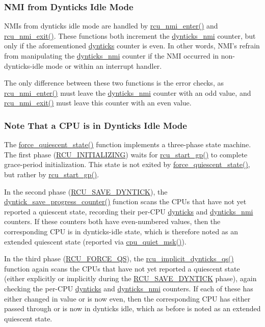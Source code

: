 \subsubsection{NMI from Dynticks Idle Mode}
\label{app:rcuimpl:rcutree:NMI from Dynticks Idle Mode}

NMIs from dynticks idle mode are handled by \url{rcu_nmi_enter()}
and \url{rcu_nmi_exit()}.
These functions both increment the \url{dynticks_nmi} counter,
but only if the aforementioned \url{dynticks} counter is even.
In other words, NMI's refrain from manipulating the
\url{dynticks_nmi} counter if the NMI occurred in non-dynticks-idle
mode or within an interrupt handler.

The only difference between these two functions is the error checks,
as \url{rcu_nmi_enter()} must leave the \url{dynticks_nmi}
counter with an odd value, and \url{rcu_nmi_exit()} must leave
this counter with an even value.

\subsubsection{Note That a CPU is in Dynticks Idle Mode}
\label{app:rcuimpl:rcutree:Note That a CPU is in Dynticks Idle Mode}

The \url{force_quiescent_state()} function implements a
three-phase state machine.
The first phase (\url{RCU_INITIALIZING}) waits for \url{rcu_start_gp()}
to complete grace-period initialization.
This state is not exited by \url{force_quiescent_state()}, but rather
by \url{rcu_start_gp()}.

In the second phase (\url{RCU_SAVE_DYNTICK}), the
\url{dyntick_save_progress_counter()} function scans the CPUs that
have not yet reported a quiescent state, recording their per-CPU
\url{dynticks} and \url{dynticks_nmi} counters.
If these counters both have even-numbered values, then the corresponding
CPU is in dynticks-idle state, which is therefore noted as an extended
quiescent state (reported via \url{cpu_quiet_msk()}).

In the third phase (\url{RCU_FORCE_QS}), the
\url{rcu_implicit_dynticks_qs()} function again scans the CPUs
that have not yet reported a quiescent state (either explicitly or
implicitly during the \url{RCU_SAVE_DYNTICK} phase), again checking the
per-CPU \url{dynticks} and \url{dynticks_nmi} counters.
If each of these has either changed in value or is now even, then
the corresponding CPU has either passed through or is now in dynticks
idle, which as before is noted as an extended quiescent state.


